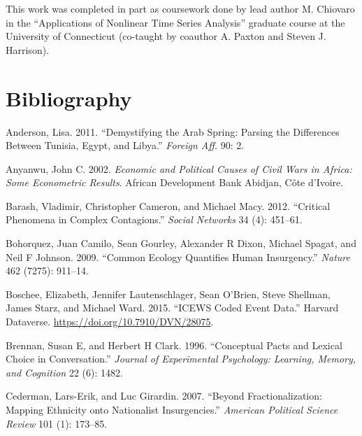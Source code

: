 \documentclass[
  english,
  man]{apa6}
\begin{document}
This work was completed in part as coursework done by lead author M. Chiovaro in
the \enquote{Applications of Nonlinear Time Series Analysis} graduate course at the
University of Connecticut (co-taught by coauthor A. Paxton and Steven J.
Harrison).

\newpage

\hypertarget{bibliography}{%
\section{Bibliography}\label{bibliography}}

\begingroup
\setlength{\parindent}{-0.5in}
\setlength{\leftskip}{0.5in}

\hypertarget{refs}{}
\leavevmode\hypertarget{ref-anderson2011demystifying}{}%
Anderson, Lisa. 2011. ``Demystifying the Arab Spring: Parsing the Differences Between Tunisia, Egypt, and Libya.'' \emph{Foreign Aff.} 90: 2.

\leavevmode\hypertarget{ref-anyanwu2002economic}{}%
Anyanwu, John C. 2002. \emph{Economic and Political Causes of Civil Wars in Africa: Some Econometric Results}. African Development Bank Abidjan, Côte d'Ivoire.

\leavevmode\hypertarget{ref-barash2012critical}{}%
Barash, Vladimir, Christopher Cameron, and Michael Macy. 2012. ``Critical Phenomena in Complex Contagions.'' \emph{Social Networks} 34 (4): 451--61.

\leavevmode\hypertarget{ref-bohorquez2009common}{}%
Bohorquez, Juan Camilo, Sean Gourley, Alexander R Dixon, Michael Spagat, and Neil F Johnson. 2009. ``Common Ecology Quantifies Human Insurgency.'' \emph{Nature} 462 (7275): 911--14.

\leavevmode\hypertarget{ref-DVNux2f28075_2015}{}%
Boschee, Elizabeth, Jennifer Lautenschlager, Sean O'Brien, Steve Shellman, James Starz, and Michael Ward. 2015. ``ICEWS Coded Event Data.'' Harvard Dataverse. \url{https://doi.org/10.7910/DVN/28075}.

\leavevmode\hypertarget{ref-brennan1996conceptual}{}%
Brennan, Susan E, and Herbert H Clark. 1996. ``Conceptual Pacts and Lexical Choice in Conversation.'' \emph{Journal of Experimental Psychology: Learning, Memory, and Cognition} 22 (6): 1482.

\leavevmode\hypertarget{ref-cederman2007beyond}{}%
Cederman, Lars-Erik, and Luc Girardin. 2007. ``Beyond Fractionalization: Mapping Ethnicity onto Nationalist Insurgencies.'' \emph{American Political Science Review} 101 (1): 173--85.
\end{document}
